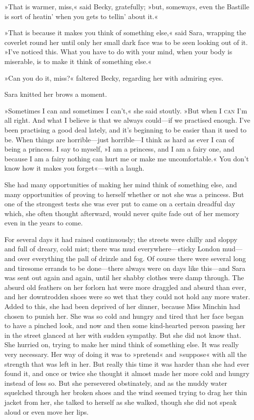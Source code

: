 »That is warmer, miss,« said Becky, gratefully; »but, someways, even the Bastille is sort of heatin' when you gets to tellin' about it.«

»That is because it makes you think of something else,« said Sara, wrapping the coverlet round her until only her small dark face was to be seen looking out of it. »I've noticed this. What you have to do with your mind, when your body is miserable, is to make it think of something else.«

»Can you do it, miss?« faltered Becky, regarding her with admiring eyes.

Sara knitted her brows a moment.

»Sometimes I can and sometimes I can't,« she said stoutly. »But when I \textsc{can} I'm all right. And what I believe is that we always could—if we practised enough. I've been practising a good deal lately, and it's beginning to be easier than it used to be. When things are horrible—just horrible—I think as hard as ever I can of being a princess. I say to myself, »I am a princess, and I am a fairy one, and because I am a fairy nothing can hurt me or make me uncomfortable.« You don't know how it makes you forget«—with a laugh.

She had many opportunities of making her mind think of something else, and many opportunities of proving to herself whether or not she was a princess. But one of the strongest tests she was ever put to came on a certain dreadful day which, she often thought afterward, would never quite fade out of her memory even in the years to come.

For several days it had rained continuously; the streets were chilly and sloppy and full of dreary, cold mist; there was mud everywhere—sticky London mud—and over everything the pall of drizzle and fog. Of course there were several long and tiresome errands to be done—there always were on days like this—and Sara was sent out again and again, until her shabby clothes were damp through. The absurd old feathers on her forlorn hat were more draggled and absurd than ever, and her downtrodden shoes were so wet that they could not hold any more water. Added to this, she had been deprived of her dinner, because Miss Minchin had chosen to punish her. She was so cold and hungry and tired that her face began to have a pinched look, and now and then some kind-hearted person passing her in the street glanced at her with sudden sympathy. But she did not know that. She hurried on, trying to make her mind think of something else. It was really very necessary. Her way of doing it was to »pretend« and »suppose« with all the strength that was left in her. But really this time it was harder than she had ever found it, and once or twice she thought it almost made her more cold and hungry instead of less so. But she persevered obstinately, and as the muddy water squelched through her broken shoes and the wind seemed trying to drag her thin jacket from her, she talked to herself as she walked, though she did not speak aloud or even move her lips.

